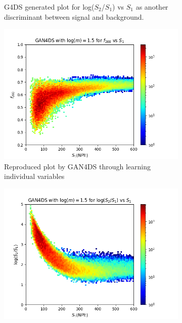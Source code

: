 \documentclass[11pt]{article} %
\begin{document}
\begin{figure}[H]
\begin{minipage}{\textwidth}
\begin{subfigure}{.5\textwidth}
      \caption{G4DS generated plot for log($S_2$/$S_1$) vs $S_1$ as another discriminant between signal and background.}
  \end{subfigure}
\end{minipage}
\begin{minipage}{\textwidth}
  \begin{subfigure}{.5\textwidth}
      \centering\captionsetup{width=.8\linewidth}%
      \includegraphics[scale=0.5]{./images/1.5/gan_f200_vs_s1.png}
      \caption{Reproduced plot by GAN4DS through learning individual variables}
  \end{subfigure}
  \begin{subfigure}{.5\textwidth}
      \centering\captionsetup{width=.8\linewidth}%
      \includegraphics[scale=0.5]{./images/1.5/gan_s1_over_s2_vs_s1.png}

\end{subfigure}
\end{minipage}
\end{figure}
\end{document}

